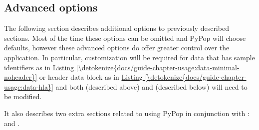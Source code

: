 \documentclass[letterpaper,10pt,english,openany,oneside]{sphinxmanual}
\begin{document}
\subsection{Advanced options}
\label{\detokenize{docs/guide-chapter-usage:advanced-options}}\label{\detokenize{docs/guide-chapter-usage:config-advanced}}
\sphinxAtStartPar
The following section describes additional options to previously
described sections. Most of the time these options can be omitted and
PyPop will choose defaults, however these advanced options do offer
greater control over the application. In particular, customization will
be required for data that has sample identifiers as in
\hyperref[\detokenize{docs/guide-chapter-usage:data-minimal-noheader}]{Listing \ref{\detokenize{docs/guide-chapter-usage:data-minimal-noheader}}} or header data block as in
\hyperref[\detokenize{docs/guide-chapter-usage:data-hla}]{Listing \ref{\detokenize{docs/guide-chapter-usage:data-hla}}} and both  (described
above) and  (described below) will need to be
modified.

\sphinxAtStartPar
It also describes two extra sections related to using PyPop in
conjunction with : \sphinxcode{\sphinxupquote{{[}Arlequin{]}}} and
\sphinxcode{\sphinxupquote{{[}HardyWeinbergGuoThompsonArlequin{]}}}.
\end{document}
